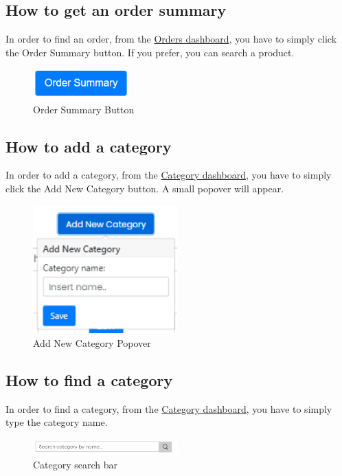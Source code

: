 \subsection{How to get an order summary}\label{_orderSummary}
In order to find an order, from the \hyperref[_ordermanagement]{Orders dashboard}, you have to simply click the Order Summary button. If you prefer, you can search a product.
\begin{figure}[H]
    \centering
    \includegraphics[width=10em]{res/images/venditore/ordersummarybutton.png}
    \caption{Order Summary Button}
\end{figure}

\subsection{How to add a category}\label{_addCategory}
In order to add a category, from the \hyperref[_categorymanagement]{Category dashboard}, you have to simply click the Add New Category button.
A small popover will appear.
\begin{figure}[H]
    \centering
    \includegraphics[width=15em]{res/images/venditore/addcategory.png}
    \caption{Add New Category Popover}
\end{figure}

\subsection{How to find a category}\label{_findCategory}
In order to find a category, from the \hyperref[_categorymanagement]{Category dashboard}, you have to simply type the category name.
\begin{figure}[H]
    \centering
    \includegraphics[width=15em]{res/images/venditore/categorysearchbar.png}
    \caption{Category search bar}
\end{figure}

